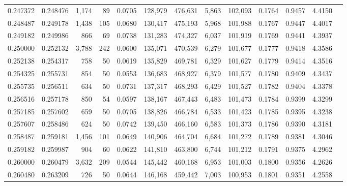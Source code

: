 \begin{tabular}{rrrrrrrrrrrrr}
0.247372 & 0.248476 & 1,174 &  89 &                                     0.0705 & 128,979 & 476,631 &   5,863 & 102,093 & 0.1764 & 0.9457 & 4.4150 \\
0.248487 & 0.249178 & 1,438 & 105 &                                     0.0680 & 130,417 & 475,193 &   5,968 & 101,988 & 0.1767 & 0.9447 & 4.4017 \\
0.249182 & 0.249986 &   866 &  69 &                                     0.0738 & 131,283 & 474,327 &   6,037 & 101,919 & 0.1769 & 0.9441 & 4.3937 \\
0.250000 & 0.252132 & 3,788 & 242 &                                     0.0600 & 135,071 & 470,539 &   6,279 & 101,677 & 0.1777 & 0.9418 & 4.3586 \\
0.252138 & 0.254317 &   758 &  50 &                                     0.0619 & 135,829 & 469,781 &   6,329 & 101,627 & 0.1779 & 0.9414 & 4.3516 \\
0.254325 & 0.255731 &   854 &  50 &                                     0.0553 & 136,683 & 468,927 &   6,379 & 101,577 & 0.1780 & 0.9409 & 4.3437 \\
0.255735 & 0.256511 &   634 &  50 &                                     0.0731 & 137,317 & 468,293 &   6,429 & 101,527 & 0.1782 & 0.9404 & 4.3378 \\
0.256516 & 0.257178 &   850 &  54 &                                     0.0597 & 138,167 & 467,443 &   6,483 & 101,473 & 0.1784 & 0.9399 & 4.3299 \\
0.257185 & 0.257602 &   659 &  50 &                                     0.0705 & 138,826 & 466,784 &   6,533 & 101,423 & 0.1785 & 0.9395 & 4.3238 \\
0.257607 & 0.258486 &   624 &  50 &                                     0.0742 & 139,450 & 466,160 &   6,583 & 101,373 & 0.1786 & 0.9390 & 4.3181 \\
0.258487 & 0.259181 & 1,456 & 101 &                                     0.0649 & 140,906 & 464,704 &   6,684 & 101,272 & 0.1789 & 0.9381 & 4.3046 \\
0.259182 & 0.259987 &   904 &  60 &                                     0.0622 & 141,810 & 463,800 &   6,744 & 101,212 & 0.1791 & 0.9375 & 4.2962 \\
0.260000 & 0.260479 & 3,632 & 209 &                                     0.0544 & 145,442 & 460,168 &   6,953 & 101,003 & 0.1800 & 0.9356 & 4.2626 \\
0.260480 & 0.263209 &   726 &  50 &                                     0.0644 & 146,168 & 459,442 &   7,003 & 100,953 & 0.1801 & 0.9351 & 4.2558 \\

\end{tabular}
